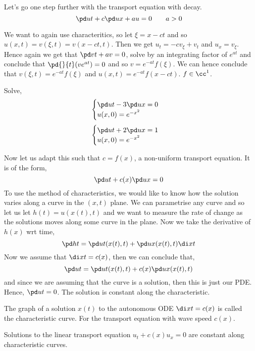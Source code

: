 Let's go one step further with the transport equation with decay.
$$ \pd u t + c \pd u x + au = 0 \qquad a > 0 $$
\begin{eg}
  We want to again use characteritics, so let $\xi = x - ct$ and so $u(x, t) = v(\xi, t) = v(x - ct, t)$. Then we get $u_t = -cv_\xi + v_t$ and $u_x = v_\xi$. Hence again we get that $\pd v t + av = 0$, solve by an integrating factor of $e^{at}$ and conclude that $\pd{}{t}(ve^{at}) = 0$ and so $v = e^{-at}f(\xi)$. We can hence conclude that $v(\xi, t) = e^{-at}f(\xi)$ and $u(x, t) = e^{-at}f(x - ct)$. $f \in \cc^1$.
\end{eg}

\begin{exercise}
  Solve,
  $$ \begin{cases}
    \pd u t - 3\pd u x = 0\\
    u(x, 0) = e^{-x^2}
  \end{cases} $$
  $$ \begin{cases}
    \pd u t + 2\pd u x = 1\\
    u(x, 0) = e^{-x^2}
  \end{cases} $$
\end{exercise}

Now let us adapt this such that $c = f(x)$, a non-uniform transport equation. It is of the form,
$$ \pd u t + c(x)\pd u x = 0 $$
To use the method of characteristics, we would like to know how the solution varies along a curve in the $(x, t)$ plane. We can parametrise any curve and so let us let $h(t) = u(x(t), t)$ and we want to measure the rate of change as the solutions moves along some curve in the plane. Now we take the derivative of $h(x)$ wrt time,
$$ \pd h t = \pd u t (x(t), t) + \pd u x(x(t), t)\di x t $$
Now we assume that $\di x t = c(x)$, then we can conclude that, $$\pd u t = \pd u t (x(t), t) + c(x) \pd u x(x(t), t)$$
and since we are assuming that the curve is a solution, then this is just our PDE. Hence, $\pd u t = 0$. The solution is constant along the characteristic.

\begin{ndefi}
  The graph of a solution $x(t)$ to the autonomous ODE $\di x t = c(x)$ is called the characteristic curve. For the transport equation with wave speed $c(x)$.
\end{ndefi}

\begin{nprop}
   Solutions to the linear transport equation $u_t + c(x) u_x = 0$ are constant along characteristic curves.
\end{nprop}

